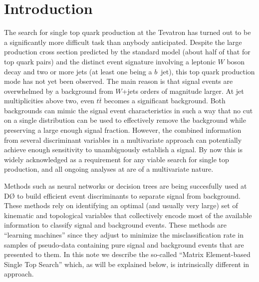 \section{Introduction}

The search for single top quark production at the Tevatron has turned
out to be a significantly more difficult task than anybody
anticipated. Despite the large production cross section predicted by
the standard model (about half of that for top quark pairs) and the
distinct event signature involving a leptonic $W$ boson decay and two
or more jets (at least one being a $b$~jet), this top quark production
mode has not yet been observed. The main reason is that signal events
are overwhelmed by a background from $W$+jets orders of magnitude
larger. At jet multiplicities above two, even $t\bar{t}$ becomes a
significant background. Both backgrounds can mimic the signal event
characteristics in such a way that no cut on a single distribution can
be used to effectively remove the background while preserving a large
enough signal fraction. However, the combined information from
several discriminant variables in a multivariate approach can
potentially achieve enough sensitivity to unambiguously establish a
signal. By now this is widely acknowledged as a requirement for any
viable search for single top production, and all ongoing analyses at
{\dzero} are of a multivariate nature.

Methods such as neural networks or decision trees are being
succesfully used at D{\O} to build efficient event discriminants to
separate signal from background. These methods rely on identifying an
optimal (and usually very large) set of kinematic and topological
variables that collectively encode most of the available information
to classify signal and background events. These methods are ``learning
machines'' since they adjust to minimize the misclassification rate in
samples of pseudo-data containing pure signal and background events
that are presented to them. In this note we describe the so-called
``Matrix Element-based Single Top Search'' which, as will be explained
below, is intrinsically different in approach.

